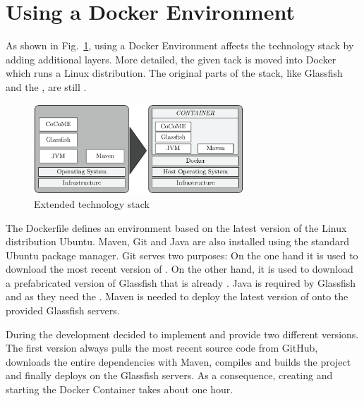 \newpage

\section{Using a Docker Environment} \label{Docker}

As shown in Fig.~\ref{techStack}, using a Docker Environment affects the technology stack by adding additional layers. 
More detailed, the given \CoCoME {}tack is moved into  Docker  which runs a Linux distribution. 
The original parts of the stack, like Glassfish and the ,  are still .
	
	\begin{figure}[!h]
		\centering
		\includegraphics[width = 0.7\textwidth]{img/tech_stack_CoCoME.pdf}
		\caption{Extended technology stack \CoCoME}
		\label{techStack}
	\end{figure}
\noindent	
The Dockerfile defines an environment based on the latest version of the Linux distribution Ubuntu.
Maven, Git and Java are also installed using the standard Ubuntu package manager. %
Git serves two purposes: On the one hand it is used to download the most recent version of  \CoCoME {}.
On the other hand, it is used to download a prefabricated version of Glassfish that is already . 
Java is required by Glassfish and \CoCoME as they need the . 
Maven is needed to  deploy the latest version of \CoCoME onto the provided Glassfish servers.

During the development decided to implement and provide two different versions. 
The first version always pulls the most recent \CoCoME source code from GitHub, downloads the entire dependencies with Maven, compiles and builds the project and finally deploys \CoCoME on the Glassfish servers. 
As a consequence, creating and starting the Docker Container  takes about one hour.


